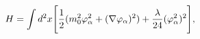 \begin{equation}
H = 
\int d^2x \Biggl[{1 \over 2}( m_0^2 \varphi_{\alpha}^2
 + (\nabla \varphi_{\alpha})^2) 
+ {\lambda \over 24} (\varphi_{\alpha}^2)^2 \Biggr] ,
\label{eq:1} \\
\end{equation}

